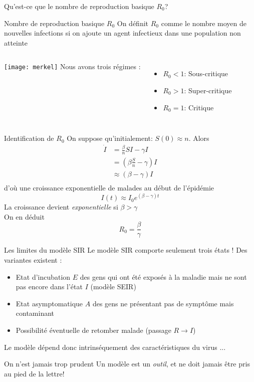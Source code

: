 \documentclass[10pt]{beamer}
\begin{document}
\begin{frame}{Qu'est-ce que le nombre de reproduction basique $R_0$?}

  \begin{block}{Nombre de reproduction basique $R_0$}
   On définit $R_0$ comme le nombre moyen de nouvelles infections si on
   ajoute un agent infectieux dans une population non atteinte
  \end{block}

  \vspace{1cm}
  \begin{columns}
      \texttt{[image: merkel]}
    Nous avons trois régimes :
    \begin{itemize}
      \item $R_0 < 1$: Sous-critique
      \item $R_0 > 1$: Super-critique
      \item $R_0 = 1$: Critique
    \end{itemize}
  \end{columns}
\end{frame}

\begin{frame}{Identification de $R_0$}
  On suppose qu'initialement: $S(0) \approx n$. Alors
  \[
    \begin{aligned}
      \dot{I} &= \frac{\beta}{n} S I - \gamma I  \\
              &= (\beta \frac{S}{n} - \gamma) I \\
              &\approx (\beta  - \gamma) I \\
    \end{aligned}
  \]
  d'où une croissance exponentielle de malades au début de l'épidémie
  \[
  I(t) \approx I_0 e^{(\beta - \gamma)t}
  \]
  La croissance devient \emph{exponentielle} si $\beta > \gamma$ \\
  On en déduit
  \[
    R_0 = \frac{\beta}{\gamma}
  \]
\end{frame}

\begin{frame}{Les limites du modèle SIR}
  Le modèle SIR comporte seulement trois états ! Des variantes existent :
  \begin{itemize}
    \item Etat d'incubation $E$ des gens qui ont été exposés à la maladie mais ne sont pas
      encore dans l'état $I$ (modèle SEIR)
    \item Etat asymptomatique $A$ des gens ne présentant pas de symptôme
      mais contaminant
    \item Possibilité éventuelle de retomber malade (passage $R \to I$)
  \end{itemize}

  Le modèle dépend donc intrinséquement des caractéristiques du virus ...

  \vspace{.5cm}
  \begin{block}{On n'est jamais trop prudent}
    Un modèle est un \emph{outil}, et ne doit jamais être pris au pied de la lettre!
  \end{block}
\end{frame}
\end{document}
